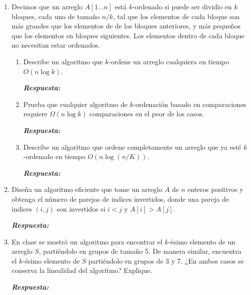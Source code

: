 \documentclass[11pt,letterpaper]{article}
\newcommand\respuesta{\textbf{\textit{Respuesta: }}}
\begin{document}
\begin{enumerate}[leftmargin=*]
\begin{enumerate}[label=\alph*)]
        \respuesta

        \item De una cota inferior sobre la complejidad de este problema, o encuentre un algoritmo más eficiente.
        
        \respuesta
    \end{enumerate}

    \item Decimos que un arreglo $A[1...n]$ está $k$-ordenado si puede ser dividio en $k$ bloques, cada uno de tamaño $n / k$, tal que los elementos de cada bloque son más grandes que los elementos de de los bloques anteriores, y más pequeños que los elementos en bloques siguientes.
    Los elementos dentro de cada bloque no necesitan estar ordenados.
    
    \begin{enumerate}[label=\alph*)]
        \item Describe un algoritmo que $k$-ordene un arreglo cualquiera en tiempo $O(n \log k)$.
        
        \respuesta
        
        \item Prueba que cualquier algoritmo de $k$-ordenación basado en comparaciones requiere $\Omega (n \log k)$ comparaciones en el peor de los casos.
        
        \respuesta
        
        \item Describe un algoritmo que ordene completamente un arreglo que ya esté $k$-ordenado en tiempo $O(n \log (n /K))$.
        
        \respuesta
    \end{enumerate}

    \item Diseña un algoritmo eficiente que tome un arreglo $A$ de $n$ enteros positivos y obtenga el número de parejas de indices invertidos, donde una pareja de indices $(i,j)$ son invertidos si $i < j$ y $A[i] > A[j]$.
    
    \respuesta

    \item En clase se mostró un algoritmo para encontrar el $k$-ésimo elemento de un arreglo $S$, partiéndolo en grupos de tamaño 5.
    De manera similar, encuentra el $k$-ésimo elemento de $S$ partiéndolo en grupos de 3 y 7.
    ¿En ambos casos se conserva la linealidad del algoritmo? Explique.

    \respuesta


\end{enumerate}
\end{document}
